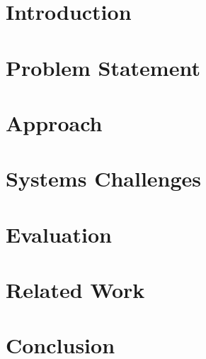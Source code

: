 \section{Introduction}
\label{dsec:intro}


\section{Problem Statement}
\label{dsec:problem_statement}


\section{Approach}
\label{dsec:approach}


\section{Systems Challenges}
\label{dsec:implementation}


\section{Evaluation}
\label{dsec:evaluation}


%

% 

\section{Related Work}
\label{dsec:related_work}


\section{Conclusion}
\label{dsec:conclusion}


